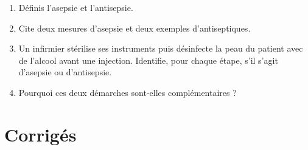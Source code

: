 \begin{enumerate}[label=\arabic*)]
\item Définis l'asepsie et l'antisepsie.
\item Cite deux mesures d'asepsie et deux exemples d'antiseptiques.
\item Un infirmier stérilise ses instruments puis désinfecte la peau du patient avec
de l'alcool avant une injection. Identifie, pour chaque étape, s'il s'agit d'asepsie
ou d'antisepsie.
\item Pourquoi ces deux démarches sont-elles complémentaires ?
\end{enumerate}

\section{Corrigés}
